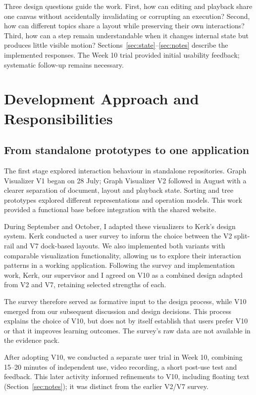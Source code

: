 \documentclass[11pt,a4paper]{article}
\newcommand{\page}{\par\penalty0 \ifdim\pagetotal>.72\textheight\clearpage\else\vspace{8pt}\fi}
\begin{document}
Three design questions guide the work. First, how can editing and playback share one canvas without accidentally invalidating or corrupting an execution? Second, how can different topics share a layout while preserving their own interactions? Third, how can a step remain understandable when it changes internal state but produces little visible motion? Sections~\ref{sec:state}--\ref{sec:notes} describe the implemented responses. The Week 10 trial provided initial usability feedback; systematic follow-up remains necessary.

\page
\section{Development Approach and Responsibilities}\label{sec:approach}
\subsection{From standalone prototypes to one application}
The first stage explored interaction behaviour in standalone repositories. Graph Visualizer V1 began on 28 July; Graph Visualizer V2 followed in August with a clearer separation of document, layout and playback state. Sorting and tree prototypes explored different representations and operation models. This work provided a functional base before integration with the shared website.

During September and October, I adapted these visualizers to Kerk's design system. Kerk conducted a user survey to inform the choice between the V2 split-rail and V7 dock-based layouts. We also implemented both variants with comparable visualization functionality, allowing us to explore their interaction patterns in a working application. Following the survey and implementation work, Kerk, our supervisor and I agreed on V10 as a combined design adapted from V2 and V7, retaining selected strengths of each.

The survey therefore served as formative input to the design process, while V10 emerged from our subsequent discussion and design decisions. This process explains the choice of V10, but does not by itself establish that users prefer V10 or that it improves learning outcomes. The survey's raw data are not available in the evidence pack.

After adopting V10, we conducted a separate user trial in Week 10, combining 15--20 minutes of independent use, video recording, a short post-use test and feedback. This later activity informed refinements to V10, including floating text (Section~\ref{sec:notes}); it was distinct from the earlier V2/V7 survey.
\end{document}
